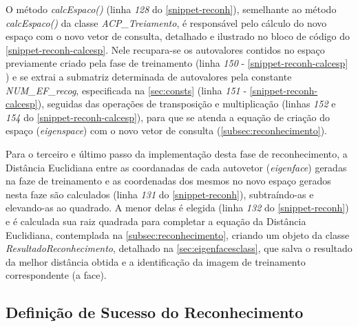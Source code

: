 O método \textit{calcEspaco()} (linha \textit{128} do \autoref{snippet-reconh}), semelhante ao método \textit{calcEspaco()} da classe \textit{ACP\_Treiamento}, é responsável pelo cálculo do novo espaço com o novo vetor de consulta, detalhado e ilustrado no bloco de código do \autoref{snippet-reconh-calcesp}. Nele recupara-se os autovalores contidos no espaço previamente criado pela fase de treinamento (linha \textit{150} - \autoref{snippet-reconh-calcesp} ) e se extrai a submatriz determinada de autovalores pela constante \textit{NUM\_EF\_recog}, especificada na \autoref{sec:consts} (linha \textit{151} - \autoref{snippet-reconh-calcesp}), seguidas das operações de transposição e multiplicação (linhas \textit{152} e \textit{154} do \autoref{snippet-reconh-calcesp}), para que se atenda a equação de criação do espaço (\textit{eigenspace}) com o novo vetor de consulta (\autoref{subsec:reconhecimento}).


\codigoJava



Para o terceiro e último passo da implementação desta fase de reconhecimento, a Distância Euclidiana entre as coordanadas de cada autovetor (\textit{eigenface}) geradas na faze de treinamento e as coordenadas dos mesmos no novo espaço gerados nesta faze são calculados (linha \textit{131} do \autoref{snippet-reconh}), subtraíndo-as e elevando-as ao quadrado. A menor delas é elegida (linha \textit{132} do \autoref{snippet-reconh}) e é calculada sua raiz quadrada para completar a equação da Distância Euclidiana, contemplada na \autoref{subsec:reconhecimento}, criando um objeto da classe \textit{ResultadoReconhecimento}, detalhado na \autoref{sec:eigenfacesclass}, que salva o resultado da melhor distância obtida e a identificação da imagem de treinamento correspondente (a face).


\subsection{Definição de Sucesso do Reconhecimento}\label{sec:defsucregoc}


